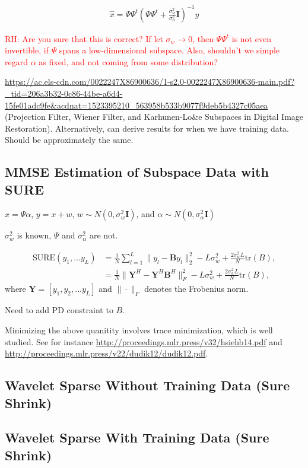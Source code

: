 \documentclass{article}
\begin{document}
\begin{align}
    \hat{x}=\Psi \Psi^t (\Psi\Psi^t+\frac{\sigma_w^2}{\sigma_\alpha^2}\mathbf{I})^{-1} y
\end{align}


\textcolor{red}{RH: Are you sure that this is correct? If let $\sigma_w\to 0$, then $\Psi\Psi^t$ is not even invertible, if $\Psi$
spans a low-dimensional subspace. Also, shouldn't we simple regard $\alpha$ as fixed, and not coming from some distribution?}



\url{https://ac.els-cdn.com/0022247X86900636/1-s2.0-0022247X86900636-main.pdf?_tid=206a3b32-0c86-44be-a6d4-15fe01adc9fe&acdnat=1523395210_563958b533b9077f9deb5b4327c05aea} (Projection Filter, Wiener Filter, and Karhunen-Lo&e Subspaces in Digital Image Restoration).
Alternatively, can derive results for when we have training data. Should be approximately the same.

\subsection{MMSE Estimation of Subspace Data with SURE}
$x=\Psi\alpha$, $y=x+w$, $w\sim N(0,\sigma_w^2\mathbf{I})$, and $\alpha\sim N(0,\sigma_\alpha^2\mathbf{I})$

$\sigma_w^2$ is known, $\Psi$ and $\sigma_\alpha^2$ are not.

\begin{align}
    \text{SURE}(y_1,...y_L)&=\frac{1}{N}\sum_{l=1}^L\|y_l-\mathbf{B}y_l\|_2^2-L\sigma_w^2+\frac{2\sigma_w^2L}{N}\text{tr}(B),\nonumber \\
    &=\frac{1}{N}\|\mathbf{Y}^H-\mathbf{Y}^H\mathbf{B}^H\|_F^2-L\sigma_w^2+\frac{2\sigma_w^2L}{N}\text{tr}(B),
\end{align}
where $\mathbf{Y}=[y_1,y_2,...y_L]$ and $\|\cdot\|_F$ denotes the Frobenius norm.

Need to add PD constraint to $B$.



Minimizing the above quanitity involves trace minimization, which is well studied. See for instance \url{http://proceedings.mlr.press/v32/hsiehb14.pdf} and \url{http://proceedings.mlr.press/v22/dudik12/dudik12.pdf}.

\subsection{Wavelet Sparse Without Training Data (Sure Shrink)}
\subsection{Wavelet Sparse With Training Data (Sure Shrink)}
\end{document}
